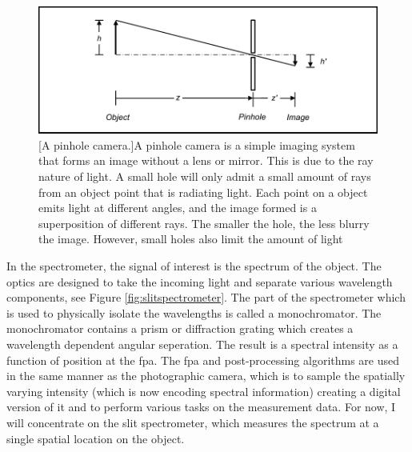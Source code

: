 \begin{figure}
    \includegraphics[scale=1]{pinholecamera}
    [A pinhole camera.]{A pinhole camera is a simple imaging system that forms an image without a lens or mirror. This is due to the ray nature of light. A small hole will only admit a small amount of rays from an object point that is radiating light. Each point on a object emits light at different angles, and the image formed is a superposition of different rays. The smaller the hole, the less blurry the image. However, small holes also limit the amount of light}
    \label{fig:pinholecamera}
\end{figure}

In the spectrometer, the signal of interest is the spectrum of the object. The optics are designed to take the incoming light and separate various wavelength components, see Figure \ref{fig:slitspectrometer}. The part of the spectrometer which is used to physically isolate the wavelengths is called a \gls{monochromator}. The monochromator contains a prism or diffraction grating which creates a wavelength dependent angular seperation. The result is a spectral intensity as a function of position at the \gls{fpa}. The \gls{fpa} and post-processing algorithms are used in the same manner as the photographic camera, which is to sample the spatially varying intensity (which is now encoding spectral information) creating a digital version of it and to perform various tasks on the measurement data. For now, I will concentrate on the slit spectrometer, which measures the spectrum at a single spatial location on the object.


